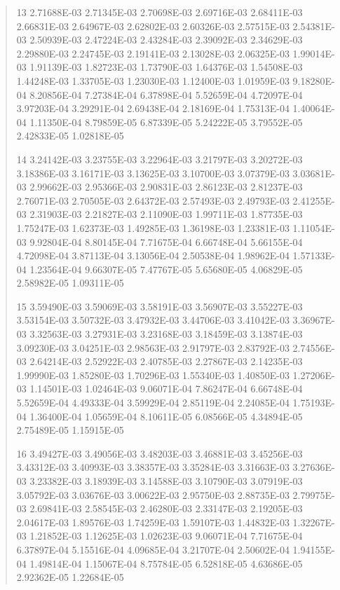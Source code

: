 \documentclass[letterpaper,10pt,english]{sphinxmanual}
\begin{document}
\begin{quote}
\begin{DUlineblock}{0em}
\item[] 13   2.71688E-03  2.71345E-03  2.70698E-03  2.69716E-03  2.68411E-03  2.66831E-03  2.64967E-03  2.62802E-03  2.60326E-03  2.57515E-03  2.54381E-03  2.50939E-03  2.47224E-03  2.43284E-03  2.39092E-03  2.34629E-03  2.29880E-03  2.24745E-03  2.19141E-03  2.13028E-03  2.06325E-03  1.99014E-03  1.91139E-03  1.82723E-03  1.73790E-03  1.64376E-03  1.54508E-03  1.44248E-03  1.33705E-03  1.23030E-03  1.12400E-03  1.01959E-03  9.18280E-04  8.20856E-04  7.27384E-04  6.37898E-04  5.52659E-04  4.72097E-04  3.97203E-04  3.29291E-04  2.69438E-04  2.18169E-04  1.75313E-04  1.40064E-04  1.11350E-04  8.79859E-05  6.87339E-05  5.24222E-05  3.79552E-05  2.42833E-05  1.02818E-05
\item[] 14   3.24142E-03  3.23755E-03  3.22964E-03  3.21797E-03  3.20272E-03  3.18386E-03  3.16171E-03  3.13625E-03  3.10700E-03  3.07379E-03  3.03681E-03  2.99662E-03  2.95366E-03  2.90831E-03  2.86123E-03  2.81237E-03  2.76071E-03  2.70505E-03  2.64372E-03  2.57493E-03  2.49793E-03  2.41255E-03  2.31903E-03  2.21827E-03  2.11090E-03  1.99711E-03  1.87735E-03  1.75247E-03  1.62373E-03  1.49285E-03  1.36198E-03  1.23381E-03  1.11054E-03  9.92804E-04  8.80145E-04  7.71675E-04  6.66748E-04  5.66155E-04  4.72098E-04  3.87113E-04  3.13056E-04  2.50538E-04  1.98962E-04  1.57133E-04  1.23564E-04  9.66307E-05  7.47767E-05  5.65680E-05  4.06829E-05  2.58982E-05  1.09311E-05
\item[] 15   3.59490E-03  3.59069E-03  3.58191E-03  3.56907E-03  3.55227E-03  3.53154E-03  3.50732E-03  3.47932E-03  3.44706E-03  3.41042E-03  3.36967E-03  3.32563E-03  3.27931E-03  3.23168E-03  3.18459E-03  3.13874E-03  3.09230E-03  3.04251E-03  2.98563E-03  2.91797E-03  2.83792E-03  2.74556E-03  2.64214E-03  2.52922E-03  2.40785E-03  2.27867E-03  2.14235E-03  1.99990E-03  1.85280E-03  1.70296E-03  1.55340E-03  1.40850E-03  1.27206E-03  1.14501E-03  1.02464E-03  9.06071E-04  7.86247E-04  6.66748E-04  5.52659E-04  4.49333E-04  3.59929E-04  2.85119E-04  2.24085E-04  1.75193E-04  1.36400E-04  1.05659E-04  8.10611E-05  6.08566E-05  4.34894E-05  2.75489E-05  1.15915E-05
\item[] 16   3.49427E-03  3.49056E-03  3.48203E-03  3.46881E-03  3.45256E-03  3.43312E-03  3.40993E-03  3.38357E-03  3.35284E-03  3.31663E-03  3.27636E-03  3.23382E-03  3.18939E-03  3.14588E-03  3.10790E-03  3.07919E-03  3.05792E-03  3.03676E-03  3.00622E-03  2.95750E-03  2.88735E-03  2.79975E-03  2.69841E-03  2.58545E-03  2.46280E-03  2.33147E-03  2.19205E-03  2.04617E-03  1.89576E-03  1.74259E-03  1.59107E-03  1.44832E-03  1.32267E-03  1.21852E-03  1.12625E-03  1.02623E-03  9.06071E-04  7.71675E-04  6.37897E-04  5.15516E-04  4.09685E-04  3.21707E-04  2.50602E-04  1.94155E-04  1.49814E-04  1.15067E-04  8.75784E-05  6.52818E-05  4.63686E-05  2.92362E-05  1.22684E-05

\end{DUlineblock}
\end{quote}
\end{document}
